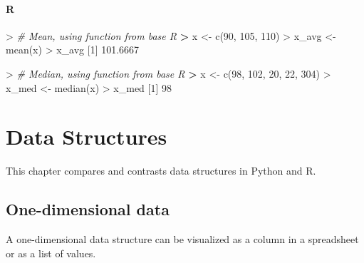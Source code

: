 \documentclass[
]{book}
\newenvironment{Shaded}{\begin{snugshade}}{\end{snugshade}}
\newcommand{\CommentTok}[1]{\textcolor[rgb]{0.56,0.35,0.01}{\textit{#1}}}
\newcommand{\DecValTok}[1]{\textcolor[rgb]{0.00,0.00,0.81}{#1}}
\newcommand{\ErrorTok}[1]{\textcolor[rgb]{0.64,0.00,0.00}{\textbf{#1}}}
\newcommand{\FloatTok}[1]{\textcolor[rgb]{0.00,0.00,0.81}{#1}}
\newcommand{\FunctionTok}[1]{\textcolor[rgb]{0.00,0.00,0.00}{#1}}
\newcommand{\NormalTok}[1]{#1}
\newcommand{\OtherTok}[1]{\textcolor[rgb]{0.56,0.35,0.01}{#1}}
\newcommand{\SpecialCharTok}[1]{\textcolor[rgb]{0.00,0.00,0.00}{#1}}
\begin{document}
\hypertarget{r-6}{%
\subsubsection*{R}\label{r-6}}

\begin{Shaded}
\begin{Highlighting}[]
\SpecialCharTok{\textgreater{}} \CommentTok{\# Mean, using function from base R}
\ErrorTok{\textgreater{}}\NormalTok{ x }\OtherTok{\textless{}{-}} \FunctionTok{c}\NormalTok{(}\DecValTok{90}\NormalTok{, }\DecValTok{105}\NormalTok{, }\DecValTok{110}\NormalTok{)}
\SpecialCharTok{\textgreater{}}\NormalTok{ x\_avg }\OtherTok{\textless{}{-}} \FunctionTok{mean}\NormalTok{(x)}
\SpecialCharTok{\textgreater{}}\NormalTok{ x\_avg}
\NormalTok{[}\DecValTok{1}\NormalTok{] }\FloatTok{101.6667}
\end{Highlighting}
\end{Shaded}

\begin{Shaded}
\begin{Highlighting}[]
\SpecialCharTok{\textgreater{}} \CommentTok{\# Median, using function from base R}
\ErrorTok{\textgreater{}}\NormalTok{ x }\OtherTok{\textless{}{-}} \FunctionTok{c}\NormalTok{(}\DecValTok{98}\NormalTok{, }\DecValTok{102}\NormalTok{, }\DecValTok{20}\NormalTok{, }\DecValTok{22}\NormalTok{, }\DecValTok{304}\NormalTok{)}
\SpecialCharTok{\textgreater{}}\NormalTok{ x\_med }\OtherTok{\textless{}{-}} \FunctionTok{median}\NormalTok{(x)}
\SpecialCharTok{\textgreater{}}\NormalTok{ x\_med}
\NormalTok{[}\DecValTok{1}\NormalTok{] }\DecValTok{98}
\end{Highlighting}
\end{Shaded}

\hypertarget{data-structures}{%
\chapter{Data Structures}\label{data-structures}}

This chapter compares and contrasts data structures in Python and R.

\hypertarget{one-dimensional-data}{%
\section{One-dimensional data}\label{one-dimensional-data}}

A one-dimensional data structure can be visualized as a column in a spreadsheet or as a list of values.
\end{document}
